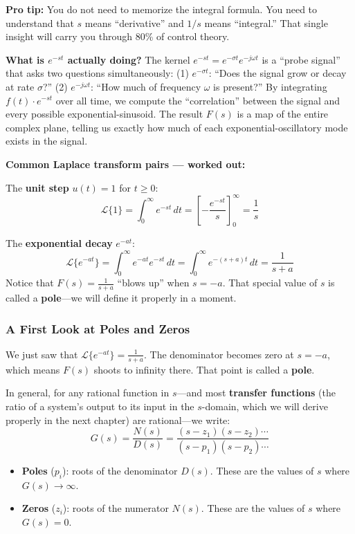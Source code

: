 \textbf{Pro tip:} You do not need to memorize the integral formula. You need to understand that $s$ means ``derivative'' and $1/s$ means ``integral.'' That single insight will carry you through 80\% of control theory.

\textbf{What is $e^{-st}$ actually doing?} The kernel $e^{-st} = e^{-\sigma t} e^{-j\omega t}$ is a ``probe signal'' that asks two questions simultaneously: (1) $e^{-\sigma t}$: ``Does the signal grow or decay at rate $\sigma$?'' (2) $e^{-j\omega t}$: ``How much of frequency $\omega$ is present?'' By integrating $f(t) \cdot e^{-st}$ over all time, we compute the ``correlation'' between the signal and every possible exponential-sinusoid. The result $F(s)$ is a map of the entire complex plane, telling us exactly how much of each exponential-oscillatory mode exists in the signal.

\textbf{Common Laplace transform pairs --- worked out:}

The \textbf{unit step} $u(t) = 1$ for $t \geq 0$:
\[
\mathcal{L}\{1\} = \int_0^{\infty} e^{-st} \, dt = \left[-\frac{e^{-st}}{s}\right]_0^{\infty} = \frac{1}{s}
\]

The \textbf{exponential decay} $e^{-at}$:
\[
\mathcal{L}\{e^{-at}\} = \int_0^{\infty} e^{-at} e^{-st} \, dt = \int_0^{\infty} e^{-(s+a)t} \, dt = \frac{1}{s+a}
\]
Notice that $F(s) = \frac{1}{s+a}$ ``blows up'' when $s = -a$. That special value of $s$ is called a \textbf{pole}---we will define it properly in a moment.

\subsubsection{A First Look at Poles and Zeros}

We just saw that $\mathcal{L}\{e^{-at}\} = \frac{1}{s+a}$. The denominator becomes zero at $s = -a$, which means $F(s)$ shoots to infinity there. That point is called a \textbf{pole}.

In general, for any rational function in $s$---and most \textbf{transfer functions} (the ratio of a system's output to its input in the $s$-domain, which we will derive properly in the next chapter) are rational---we write:
\[
G(s) = \frac{N(s)}{D(s)} = \frac{(s - z_1)(s - z_2) \cdots}{(s - p_1)(s - p_2) \cdots}
\]
\begin{itemize}[nosep]
    \item \textbf{Poles} ($p_i$): roots of the denominator $D(s)$. These are the values of $s$ where $G(s) \to \infty$.
    \item \textbf{Zeros} ($z_i$): roots of the numerator $N(s)$. These are the values of $s$ where $G(s) = 0$.
\end{itemize}

